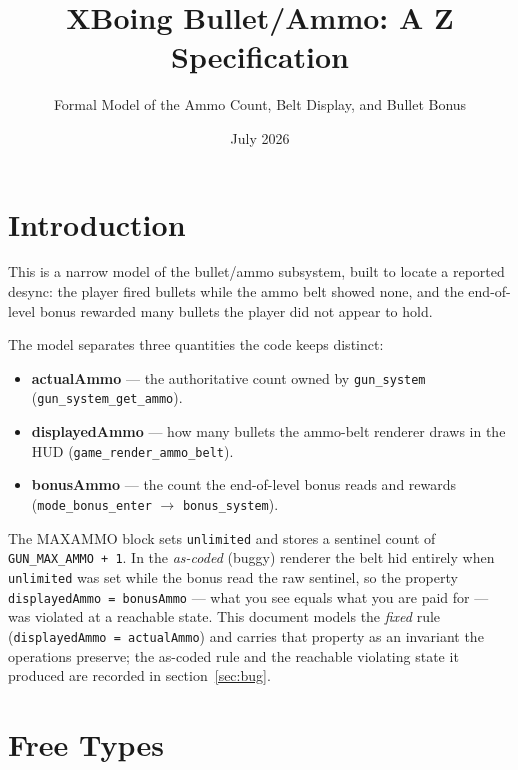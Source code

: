 \documentclass[a4paper,10pt,fleqn]{article}
\begin{document}
\title{XBoing Bullet/Ammo: A Z Specification}
\author{Formal Model of the Ammo Count, Belt Display, and Bullet Bonus}
\date{July 2026}
\maketitle

\tableofcontents
\newpage

\section{Introduction}

This is a narrow model of the bullet/ammo subsystem, built to locate a
reported desync: the player fired bullets while the ammo belt showed
none, and the end-of-level bonus rewarded many bullets the player did
not appear to hold.

The model separates three quantities the code keeps distinct:

\begin{itemize}
\item \textbf{actualAmmo} --- the authoritative count owned by
      \texttt{gun\_system} (\texttt{gun\_system\_get\_ammo}).
\item \textbf{displayedAmmo} --- how many bullets the ammo-belt renderer
      draws in the HUD (\texttt{game\_render\_ammo\_belt}).
\item \textbf{bonusAmmo} --- the count the end-of-level bonus reads and
      rewards (\texttt{mode\_bonus\_enter} $\to$
      \texttt{bonus\_system}).
\end{itemize}

The MAXAMMO block sets \texttt{unlimited} and stores a sentinel count of
\texttt{GUN\_MAX\_AMMO + 1}.  In the \emph{as-coded} (buggy) renderer the
belt hid entirely when \texttt{unlimited} was set while the bonus read the
raw sentinel, so the property \texttt{displayedAmmo = bonusAmmo} --- what
you see equals what you are paid for --- was violated at a reachable
state.  This document models the \emph{fixed} rule
(\texttt{displayedAmmo = actualAmmo}) and carries that property as an
invariant the operations preserve; the as-coded rule and the reachable
violating state it produced are recorded in section~\ref{sec:bug}.

\section{Free Types}
\end{document}
